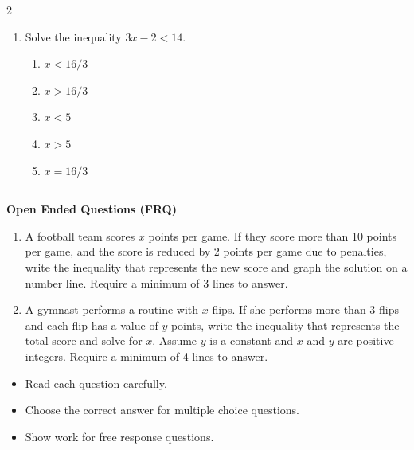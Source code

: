 \documentclass[10pt]{article}
\begin{document}
\begin{multicols}{2}
\begin{enumerate}[label=\textbf{Q\arabic*.}, leftmargin=*, itemsep=6pt, parsep=0pt]
  \item \small Solve the inequality $3x - 2 < 14$.
  \begin{enumerate}[label=(\Alph*), leftmargin=0.6cm, nosep, itemsep=2pt]
    \item $x < 16/3$
    \item $x > 16/3$
    \item $x < 5$
    \item $x > 5$
    \item $x = 16/3$
  \end{enumerate}

\end{enumerate}
\end{multicols}

\vspace{-0.2cm}
\hrule
\vspace{0.2cm}
\textbf{\small Open Ended Questions (FRQ)}
\begin{enumerate}[label=\textbf{Q\arabic*.}, start=9, itemsep=5pt, topsep=0pt]

  \item \small A football team scores $x$ points per game. If they score more than 10 points per game, and the score is reduced by 2 points per game due to penalties, write the inequality that represents the new score and graph the solution on a number line. Require a minimum of 3 lines to answer. \vspace{2cm}

  \item \small A gymnast performs a routine with $x$ flips. If she performs more than 3 flips and each flip has a value of $y$ points, write the inequality that represents the total score and solve for $x$. Assume $y$ is a constant and $x$ and $y$ are positive integers. Require a minimum of 4 lines to answer. \vspace{2cm}

\end{enumerate}

\vfill

\begin{tcolorbox}[colback=blue!5, colframe=mainblue!50, title=\small \textbf{Chef's Tips}, fonttitle=\bfseries, bottom=1mm]
\begin{itemize}[noitemsep, topsep=2pt, leftmargin=0.5cm]
  \item \scriptsize Read each question carefully.\item \scriptsize Choose the correct answer for multiple choice questions.\item \scriptsize Show work for free response questions.
\end{itemize}
\end{tcolorbox}
\end{document}
